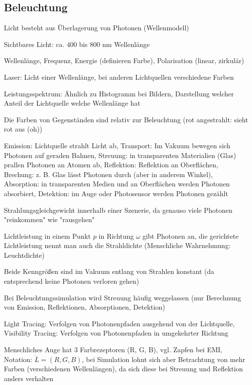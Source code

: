 \documentclass[12pt,landscape]{article}
\begin{document}
\begin{multicols}{3}
\section{Beleuchtung}
\begin{compactitem}
\item Licht besteht aus Überlagerung von Photonen (Wellenmodell)
\item Sichtbares Licht: ca. $400$ bis $800$ nm Wellenlänge
\item Wellenlänge, Frequenz, Energie (definieren Farbe), Polarisation (linear, zirkulär)
\item Laser: Licht einer Wellenlänge, bei anderen Lichtquellen verschiedene Farben
\item Leistungsspektrum: Ähnlich zu Histogramm bei Bildern, Darstellung welcher Anteil der Lichtquelle welche Wellenlänge hat
\item Die Farben von Gegenständen sind relativ zur Beleuchtung (rot angestrahlt: sieht rot aus (oh))
\item Emission: Lichtquelle strahlt Licht ab, Transport: Im Vakuum bewegen sich Photonen auf geraden Bahnen, Streuung: in transparenten Materialien (Glas) prallen Photonen an Atomen ab, Reflektion: Reflektion an Oberflächen, Brechung: z. B. Glas lässt Photonen durch (aber in anderem Winkel), Absorption: in transparenten Medien und an Oberflächen werden Photonen absorbiert, Detektion: im Auge oder Photosensor werden Photonen gezählt
\item Strahlungsgleichgewicht innerhalb einer Szenerie, da genauso viele Photonen "reinkommen" wie "rausgehen"
\item Lichtleistung in einem Punkt $p$ in Richtung $\omega$ gibt Photonen an, die gerichtete Lichtleistung nennt man auch die Strahldichte (Menschliche Wahrnehmung: Leuchtdichte)
\item Beide Kenngrößen sind im Vakuum entlang von Strahlen konstant (da entsprechend keine Photonen verloren gehen)
\item Bei Beleuchtungssimulation wird Streuung häufig weggelassen (nur Berechnung von Emission, Reflektionen, Absorptionen, Detektion)
\item Light Tracing: Verfolgen von Photonenpfaden ausgehend von der Lichtquelle, Visibility Tracing: Verfolgen von Photonenpfaden in umgekehrter Richtung
\item Menschliches Auge hat 3 Farbrezeptoren (R, G, B), vgl. Zapfen bei EMI, Notation: $\dddot{L} = (R, G, B)$, bei Simulation lohnt sich aber Betrachtung von mehr Farben (verschiedenen Wellenlängen), da sich diese bei Streuung und Reflektion anders verhalten

\end{compactitem}
\end{multicols}
\end{document}
